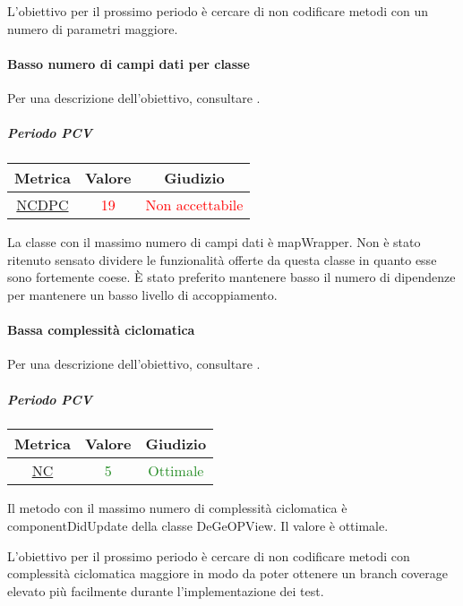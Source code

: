 			L'obiettivo per il prossimo periodo è cercare di non codificare metodi con un numero di parametri maggiore.
			
			\newpage
			\paragraph{Basso numero di campi dati per classe}
			Per una descrizione dell'obiettivo, consultare .
				\subparagraph{Periodo PCV}
				
				\begin{table}[H]
					\centering
					\begin{tabular}{  c | c | c}
						\hline
						\textbf{Metrica} & \textbf{Valore} & \textbf{Giudizio} \\
						\hline
						\hyperref[MMC]{NCDPC}   & \textcolor{Red}{19}          & \textcolor{Red}{Non accettabile}  \\ \hline
					\end{tabular} 
				\end{table}
				La classe con il massimo numero di campi dati è mapWrapper. Non è stato ritenuto sensato dividere le funzionalità offerte da questa classe in quanto esse sono fortemente coese. È stato preferito mantenere basso il numero di dipendenze per mantenere un basso livello di accoppiamento.
				
				\newpage
			\paragraph{Bassa complessità ciclomatica}
			Per una descrizione dell'obiettivo, consultare .
				\subparagraph{Periodo PCV}
				
				\begin{table}[H]
					\centering
					\begin{tabular}{  c | c | c}
						\hline
						\textbf{Metrica} & \textbf{Valore} & \textbf{Giudizio} \\
						\hline
						\hyperref[MMC]{NC}   & \textcolor{ForestGreen}{5}          & \textcolor{ForestGreen}{Ottimale}  \\ \hline
					\end{tabular} 
				\end{table}
			Il metodo con il massimo numero di complessità ciclomatica è componentDidUpdate della classe DeGeOPView. Il valore è ottimale.
			
			L'obiettivo per il prossimo periodo è cercare di non codificare metodi con complessità ciclomatica maggiore in modo da poter ottenere un branch coverage elevato più facilmente durante l'implementazione dei test.
			
